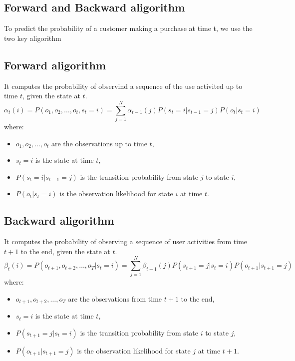 \documentclass{article}
\begin{document}
\subsection*{Forward and Backward aligorithm}
To predict the probability of a customer making a purchase at time t, we use the two key aligorithm
\subsection*{Forward aligorithm}
It computes the probability of observind a sequence of the use activited up to time \(t\), given the state at \(t\).
\[
\alpha_t(i) = P(o_1, o_2, \ldots, o_t, s_t = i) = \sum_{j=1}^{N} \alpha_{t-1}(j) P(s_t = i | s_{t-1} = j) P(o_t | s_t = i)
\]
where:
\begin{itemize}
    \item \(o_1, o_2, \ldots, o_t\) are the observations up to time \(t\),
    \item \(s_t = i\) is the state at time \(t\),
    \item \(P(s_t = i | s_{t-1} = j)\) is the transition probability from state \(j\) to state \(i\),
    \item \(P(o_t | s_t = i)\) is the observation likelihood for state \(i\) at time \(t\).
\end{itemize}


\subsection*{Backward aligorithm}

It computes the probability of observing a sequence of user activities from time \(t+1\) to the end, given the state at \(t\).
\[
\beta_t(i) = P(o_{t+1}, o_{t+2}, \ldots, o_T | s_t = i) = \sum_{j=1}^{N} \beta_{t+1}(j) P(s_{t+1} = j | s_t = i) P(o_{t+1} | s_{t+1} = j)
\]
where:
\begin{itemize}
    \item \(o_{t+1}, o_{t+2}, \ldots, o_T\) are the observations from time \(t+1\) to the end,
    \item \(s_t = i\) is the state at time \(t\),
    \item \(P(s_{t+1} = j | s_t = i)\) is the transition probability from state \(i\) to state \(j\),
    \item \(P(o_{t+1} | s_{t+1} = j)\) is the observation likelihood for state \(j\) at time \(t+1\).
\end{itemize}
\end{document}
